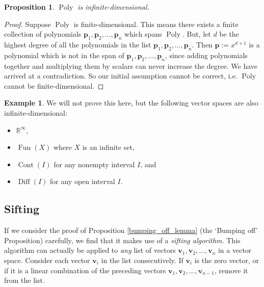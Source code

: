 \documentclass[a4paper,11pt]{book}
\newtheorem{proposition}[theorem]{Proposition}
\theoremstyle{definition}
\newtheorem{example_environment}{Example}[chapter]
\newcommand{\ve}[1]{\mathbf{#1}}
\newenvironment{example}
	{
		\begin{oframed} 
		\begin{example_environment}
	}
	{
		\end{example_environment}
		\end{oframed}
	}
\DeclareMathOperator{\Fun}{Fun}
\DeclareMathOperator{\Cont}{Cont}
\DeclareMathOperator{\Diff}{Diff}
\DeclareMathOperator{\Poly}{Poly}
\begin{document}
\begin{proposition} $\Poly$ is infinite-dimensional.
\end{proposition}
\begin{proof} Suppose $\Poly$ is finite-dimensional. This means there exists a finite collection of polynomials $\ve{p}_1, \ve{p}_2, \ldots, \ve{p}_n$ which spans $\Poly$. But, let $d$ be the highest degree of all the polynomials in the list $\ve{p}_1, \ve{p}_2, \ldots, \ve{p}_n$. Then $\ve{p} := x^{d+1}$ is a polynomial which is not in the span of $\ve{p}_1, \ve{p}_2, \ldots, \ve{p}_n$, since adding polynomials together and multiplying them by scalars can never increase the degree. We have arrived at a contradiction. So our initial assumption cannot be correct, i.e. $\Poly$ cannot be finite-dimensional. 
\end{proof}

\begin{example} We will not prove this here, but the following vector spaces are also infinite-dimensional:
\begin{itemize}
 \item $\mathbb{R}^\infty$,
 \item $\Fun(X)$ where $X$ is an infinite set,
 \item $\Cont(I)$ for any nonempty interval $I$, and
 \item $\Diff(I)$ for any open interval $I$.
\end{itemize}
\end{example}



\subsection{Sifting} \label{sifting_subsection}
If we consider the proof of Proposition \ref{bumping_off_lemma} (the `Bumping off' Proposition) carefully, we find that it makes use of a {\em sifting algorithm}. This algorithm can actually be applied to {\em any} list of vectors $\ve{v}_1, \ve{v}_2, \ldots, \ve{v}_n$ in a vector space.  Consider each vector $\ve{v}_i$ in the list consecutively. If $\ve{v}_i$ is the zero vector, or if it is a linear combination of the preceding vectors $\ve{v}_1, \ve{v}_2, \ldots, \ve{v}_{n-1}$, remove it from the list. 
\end{document}
